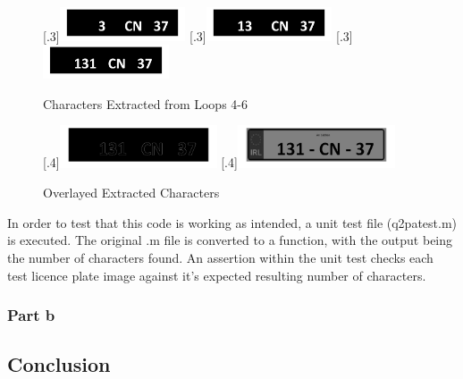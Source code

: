 \documentclass[a4paper]{article}
\begin{document}
	\begin{figure}[H]
		\centering
		[.3\linewidth]{\includegraphics[height=1cm]{Results/Q2/NumPlate1/qanumber_plate_1Added4.jpg}}%
		[.3\linewidth]{\includegraphics[height=1cm]{Results/Q2/NumPlate1/qanumber_plate_1Added5.jpg}}%
		[.3\linewidth]{\includegraphics[height=1cm]{Results/Q2/NumPlate1/qanumber_plate_1Added6.jpg}}%
		\caption{Characters Extracted from Loops 4-6}
		\label{fig:}
	\end{figure}
	\begin{figure}[H]
		\centering
		[.4\linewidth]{\includegraphics[height=1.25cm]{Results/Q2/NumPlate1/qanumber_plate_1Canny.jpg}}%
		[.4\linewidth]{\includegraphics[height=1.25cm]{Results/Q2/NumPlate1/qanumber_plate_1Overlay.jpg}}%
		\caption{Overlayed Extracted Characters}
		\label{fig:}
	\end{figure}
	\par In order to test that this code is working as intended, a unit test file
	(q2patest.m) is executed. The original .m file is converted to a
	function, with the output being the number of characters found. An
	assertion within the unit test checks each test licence plate image
	against it's expected resulting number of characters.
	\subsubsection{Part b}
	\subsection{Conclusion}
\end{document}
